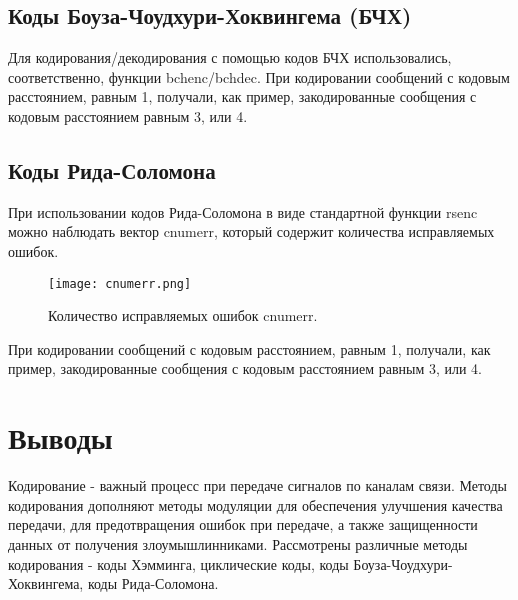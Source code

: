 \subsection{Коды Боуза-Чоудхури-Хоквингема (БЧХ)}
Для кодирования/декодирования с помощью кодов БЧХ использовались, соответственно, функции bchenc/bchdec.
При кодировании сообщений с кодовым расстоянием, равным 1, получали, как пример, закодированные сообщения с кодовым расстоянием равным 3, или 4.

\subsection{Коды Рида-Соломона}
При использовании кодов Рида-Соломона в виде стандартной функции rsenc можно наблюдать вектор cnumerr, который содержит количества исправляемых ошибок.
\begin{figure}[H]
	\begin{center}
		\texttt{[image: cnumerr.png]}
		\caption{Количество исправляемых ошибок cnumerr.} %
		\label{cnumerr} %
	\end{center}
\end{figure}
При кодировании сообщений с кодовым расстоянием, равным 1, получали, как пример, закодированные сообщения с кодовым расстоянием равным 3, или 4.

\section{Выводы}
Кодирование - важный процесс при передаче сигналов по каналам связи. Методы кодирования дополняют методы модуляции для обеспечения улучшения качества передачи, для предотвращения ошибок при передаче, а также защищенности данных от получения злоумышлинниками.
Рассмотрены различные методы кодирования - коды Хэмминга, циклические коды, коды Боуза-Чоудхури-Хоквингема, коды Рида-Соломона. 


